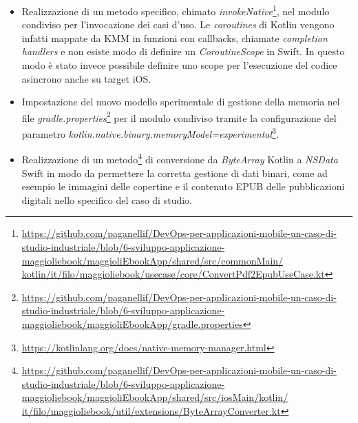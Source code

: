 \begin{itemize}
    \item Realizzazione di un metodo specifico, chimato \textit{invokeNative}\footnote{\href{https://github.com/paganellif/DevOps-per-applicazioni-mobile-un-caso-di-studio-industriale/blob/6-sviluppo-applicazione-maggioliebook/maggioliEbookApp/shared/src/commonMain/kotlin/it/filo/maggioliebook/usecase/core/ConvertPdf2EpubUseCase.kt}{https://github.com/paganellif/DevOps-per-applicazioni-mobile-un-caso-di-studio-industriale/blob/6-sviluppo-applicazione-maggioliebook/maggioliEbookApp/shared/src/commonMain/\\kotlin/it/filo/maggioliebook/usecase/core/ConvertPdf2EpubUseCase.kt}}, nel modulo condiviso per l'invocazione dei casi d'uso. Le \textit{coroutines} di Kotlin vengono infatti mappate da KMM in funzioni con callbacks, chiamate \textit{completion handlers} e non esiste modo di definire un \textit{CoroutineScope} in Swift. In questo modo è stato invece possibile definire uno scope per l'esecuzione del codice asincrono anche su target iOS.
    \item Impostazione del nuovo modello sperimentale di gestione della memoria nel file \textit{gradle.properties}\footnote{\href{https://github.com/paganellif/DevOps-per-applicazioni-mobile-un-caso-di-studio-industriale/blob/6-sviluppo-applicazione-maggioliebook/maggioliEbookApp/gradle.properties}{https://github.com/paganellif/DevOps-per-applicazioni-mobile-un-caso-di-studio-industriale/blob/6-sviluppo-applicazione-maggioliebook/maggioliEbookApp/gradle.properties}} per il modulo condiviso tramite la configurazione del parametro \textit{kotlin.native.binary.memoryModel=experimental}\footnote{\href{https://kotlinlang.org/docs/native-memory-manager.html}{https://kotlinlang.org/docs/native-memory-manager.html}}.
    \item Realizzazione di un metodo\footnote{\href{https://github.com/paganellif/DevOps-per-applicazioni-mobile-un-caso-di-studio-industriale/blob/6-sviluppo-applicazione-maggioliebook/maggioliEbookApp/shared/src/iosMain/kotlin/it/filo/maggioliebook/util/extensions/ByteArrayConverter.kt}{https://github.com/paganellif/DevOps-per-applicazioni-mobile-un-caso-di-studio-industriale/blob/6-sviluppo-applicazione-maggioliebook/maggioliEbookApp/shared/src/iosMain/kotlin/\\it/filo/maggioliebook/util/extensions/ByteArrayConverter.kt}} di conversione da \textit{ByteArray} Kotlin a \textit{NSData} Swift in modo da permettere la corretta gestione di dati binari, come ad esempio le immagini delle copertine e il contenuto EPUB delle pubblicazioni digitali nello specifico del caso di studio.

\end{itemize}
